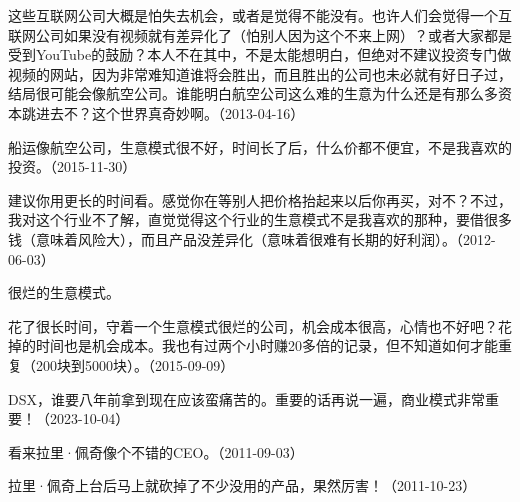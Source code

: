 这些互联网公司大概是怕失去机会，或者是觉得不能没有。也许人们会觉得一个互联网公司如果没有视频就有差异化了（怕别人因为这个不来上网）？或者大家都是受到YouTube的鼓励？本人不在其中，不是太能想明白，但绝对不建议投资专门做视频的网站，因为非常难知道谁将会胜出，而且胜出的公司也未必就有好日子过，结局很可能会像航空公司。谁能明白航空公司这么难的生意为什么还是有那么多资本跳进去不？这个世界真奇妙啊。（2013-04-16）


船运像航空公司，生意模式很不好，时间长了后，什么价都不便宜，不是我喜欢的投资。（2015-11-30）


建议你用更长的时间看。感觉你在等别人把价格抬起来以后你再买，对不？不过，我对这个行业不了解，直觉觉得这个行业的生意模式不是我喜欢的那种，要借很多钱（意味着风险大），而且产品没差异化（意味着很难有长期的好利润）。（2012-06-03）


很烂的生意模式。

花了很长时间，守着一个生意模式很烂的公司，机会成本很高，心情也不好吧？花掉的时间也是机会成本。我也有过两个小时赚20多倍的记录，但不知道如何才能重复（200块到5000块）。（2015-09-09）

DSX，谁要八年前拿到现在应该蛮痛苦的。重要的话再说一遍，商业模式非常重要！（2023-10-04）


看来拉里·佩奇像个不错的CEO。（2011-09-03）

拉里·佩奇上台后马上就砍掉了不少没用的产品，果然厉害！（2011-10-23）


